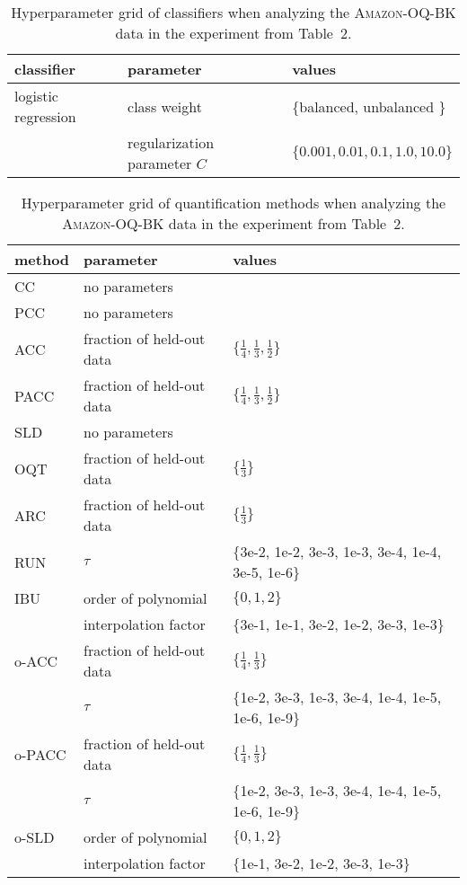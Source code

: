 \documentclass[10pt,a4paper]{article}
\begin{document}
\begin{table}
  \centering
  \caption{Hyperparameter grid of classifiers when analyzing the
  \textsc{Amazon-OQ-BK} data in the experiment from Table~2.}
  \label{tab:hyperparameter-roberta-classifier}
  \footnotesize
  \begin{tabular}{lll}
    \toprule
    classifier & parameter & values \\
    \midrule
    logistic regression & class weight & \{balanced, unbalanced \} \\
               & regularization parameter $C$ & $\{0.001, 0.01, 0.1, 1.0, 10.0\}$ \\
    \bottomrule
  \end{tabular}
\end{table}

\begin{table}
  \centering
  \caption{Hyperparameter grid of quantification methods when
  analyzing the \textsc{Amazon-OQ-BK} data in the experiment from
  Table~2.}
  \label{tab:hyperparameter-roberta-quantifier}
  \footnotesize
  \begin{tabular}{lll}
    \toprule
    method & parameter & values \\
    \midrule
    CC & no parameters & \\
    PCC & no parameters & \\
    ACC & fraction of held-out data & $\{\frac{1}{4}, \frac{1}{3}, \frac{1}{2}\}$ \\
    PACC & fraction of held-out data & $\{\frac{1}{4}, \frac{1}{3}, \frac{1}{2}\}$ \\
    SLD & no parameters & \\
    \midrule
    OQT & fraction of held-out data & $\{\frac{1}{3}\}$ \\
    ARC & fraction of held-out data & $\{\frac{1}{3}\}$ \\
    RUN & $\tau$ & $\{$3e-2, 1e-2, 3e-3, 1e-3, 3e-4, 1e-4, 3e-5, 1e-6$\}$ \\
    IBU & order of polynomial & $\{0, 1, 2\}$ \\
           & interpolation factor & $\{$3e-1, 1e-1, 3e-2, 1e-2, 3e-3, 1e-3$\}$ \\
    \midrule
    o-ACC & fraction of held-out data & $\{\frac{1}{4}, \frac{1}{3}\}$ \\
           & $\tau$ & $\{$1e-2, 3e-3, 1e-3, 3e-4, 1e-4, 1e-5, 1e-6, 1e-9$\}$ \\
    o-PACC & fraction of held-out data & $\{\frac{1}{4}, \frac{1}{3}\}$ \\
           & $\tau$ & $\{$1e-2, 3e-3, 1e-3, 3e-4, 1e-4, 1e-5, 1e-6, 1e-9$\}$ \\
    o-SLD & order of polynomial & $\{0, 1, 2\}$ \\
           & interpolation factor & $\{$1e-1, 3e-2, 1e-2, 3e-3, 1e-3$\}$ \\
    \bottomrule
  \end{tabular}
\end{table}
\end{document}
